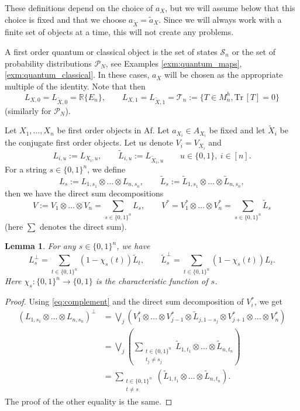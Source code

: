 \documentclass[12pt]{article}
\newtheorem{lemma}{Lemma}
\theoremstyle{definition}
\theoremstyle{remark}
\def\Te{\mathcal T}
\def\Pe{\mathcal P}
\def \Tr{\mathrm{Tr}\,}
\def\Se {\mathcal S}
\def \Af{\mathrm{Af}}
\begin{document}
These  definitions depend on the choice of $a_X$, but we will assume below that this
choice is fixed and that we choose $a_{\tilde X}=\tilde a_X$. Since we will always work
with a finite set of objects at a time, this will not create any problems. 

 A  first order quantum
or classical object  is the set of states $\Se_n$ or the set of probability distributions
$\Pe_N$, see Examples \ref{exm:quantum_maps}, \ref{exm:quantum_classical}.
In these cases, $a_X$ will be chosen as the appropriate multiple of the identity.
 Note that then
 \[
L_{X,0}=L_{\tilde X,0}= \mathbb R\{E_n\},\qquad  L_{X,1}=L_{\tilde X,1}= \Te_n:=\{T\in
M_n^h, \Tr[T]=0\}
 \]
(similarly for $\Pe_N$). 


Let $X_1,\dots,X_n$ be first order objects in $\Af$. Let $a_{X_i}\in A_{X_i}$ be fixed and
let $\tilde X_i$ be the conjugate first order objects. Let us denote $V_i=V_{X_i}$ and 
\[
L_{i,u}:= L_{X_i,u},\qquad  \tilde L_{i,u}:= L_{\tilde X_i,u} \qquad u\in \{0,1\},\ i\in [n].
\]
For a string $s\in \{0,1\}^n$, we define
\[
L_s:=L_{1,s_1}\otimes\dots \otimes L_{n,s_n}, \qquad \tilde L_s:=\tilde
L_{1,s_1}\otimes\dots \otimes \tilde L_{n,s_n},
\]
then we have the direct sum decompositions 
\[
V:=V_1\otimes \dots \otimes V_n=\sum_{s\in \{0,1\}^n} L_s,\qquad V^*=V_1^*\otimes
\dots\otimes V_n^*=\sum_{s\in \{0,1\}^n} \tilde L_s
\]
(here $\sum$ denotes the direct sum).


\begin{lemma}\label{lemma:Lperp}   For any $s\in \{0,1\}^n$, we have 
\[
L_s^\perp=
\sum_{t\in\{0,1\}^n} (1-{\chi}_s(t))\tilde L_t,\qquad \tilde L_s^\perp=
\sum_{t\in\{0,1\}^n} (1-{\chi}_s(t))L_t.
\]
Here $\chi_s:\{0,1\}^n\to\{0,1\}$ is the characteristic function of $s$. 

\end{lemma}

\begin{proof} Using \eqref{eq:complement} and the direct sum decomposition of $V_i^*$, we get
\begin{align*}
\left(L_{1,s_{1}}\otimes \dots\otimes L_{n,s_{n}}\right)^\perp&= \bigvee_j\left(
V_{1}^*\otimes
\dots \otimes V_{j-1}^*\otimes \tilde L_{j,1-s_{j}}\otimes V_{j+1}^*\otimes\dots \otimes
V_{n}^*\right)\\
&= \bigvee_j \left( \sum_{\substack{t\in \{0,1\}^n\\ t_{j}\ne s_{j}}} \tilde
L_{1,t_{1}}\otimes\dots \otimes \tilde
L_{n,t_{n}}\right)\\
&= \sum_{\substack{t\in \{0,1\}^n\\ t\ne s}} \left( \tilde L_{1,t_{1}}\otimes\dots \otimes \tilde
L_{n,t_{n}}\right).
\end{align*}
The proof of the other equality is the same.

\end{proof}
\end{document}
